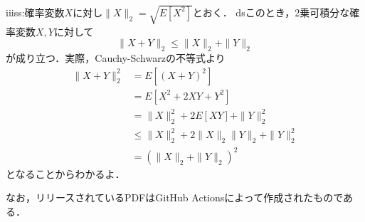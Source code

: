 \documentclass{jsarticle}
\begin{document}
iiiss:確率変数$X$に対し$\|X\|_2=\sqrt{E[X^2]}$とおく．
dsこのとき，2乗可積分な確率変数$X,Y$に対して
\[ \|X+Y\|_2\leq\|X\|_2+\|Y\|_2 \]
が成り立つ．実際，Cauchy-Schwarzの不等式より
\begin{align*}
\|X+Y\|_2^2
&=E[(X+Y)^2] \\
&=E[X^2+2XY+Y^2] \\
&=\|X\|_2^2+2E[XY]+\|Y\|_2^2 \\
&\leq\|X\|_2^2+2\|X\|_2\|Y\|_2+\|Y\|_2^2 \\
&=(\|X\|_2+\|Y\|_2)^2
\end{align*}
となることからわかるよ．

なお，リリースされているPDFはGitHub Actionsによって作成されたものである．
\end{document}
